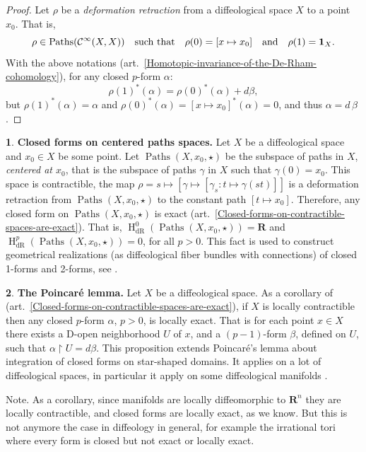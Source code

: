 \documentclass[11pt,reqno]{amsart}
\theoremstyle{definition}
\newtheorem{article}{}
\newcommand{\artlabel}[1]{{\bf #1.}}
\newcommand{\RR}{{\mathbf R}}
\def \U{{U}}
\def \X{{X}}
\newcommand{\cC}{{\mathcal C}}
\newcommand{\art}[1]{{(art.~\ref{#1})}}
\newcommand{\Paths}{\operatorname{Paths}}
\newcommand{\HDR}{{\operatorname{H}}_{\mathrm{dR}}}
\newcommand{\Cinf}{{\cC}^\infty}
\newcommand{\id}{{\bf 1}}
\begin{document}
  \begin{proof}
    Let $\rho$ be a {\em deformation retraction} from a
    diffeological space $\X$ to a point $x_0$. That is,
    $$\rho \in \Paths(\Cinf(\X,\X)) \quad \mbox{such
      that} \quad \rho(0) = [x \mapsto x_0]
      \quad\mbox{and}\quad\rho(1) = \id_\X.$$ With the
    above notations 
    \art{Homotopic-invariance-of-the-De-Rham-cohomology},
    for any closed $p$-form $\alpha$: 
    $$
      \rho(1)^*(\alpha) =
      \rho(0)^*(\alpha) + d\beta,
      $$
    but
    $\rho(1)^*(\alpha) = \alpha$ and
    $\rho(0)^*(\alpha) = [x \mapsto 
      x_0]^*(\alpha) = 0$, and thus $\alpha = d\,\beta$.
  \end{proof}
  
  \begin{article}\artlabel{Closed forms on centered paths spaces}
    \label{Closed-forms-on-centered-paths-spaces}
    Let $\X$
    be a diffeological space and $x_0 \in \X$ be some point.
    Let $\Paths(\X,x_0,\star)$ be the subspace of paths in
    $\X$, {\em centered at $x_0$\/}, that
    is the subspace of paths $\gamma$ in $\X$ such that $\gamma(0) = x_0$. 
    This space is contractible,
    the map $\rho = s \mapsto [\gamma \mapsto 
      [\gamma_{s}: t \mapsto  \gamma(st)]]$ is a deformation
    retraction from
    $\Paths(\X,x_0,\star)$ to the constant path $[t
      \mapsto x_0]$. Therefore, any closed form on
    $\Paths(\X,x_0,\star)$ is exact
    \art{Closed-forms-on-contractible-spaces-are-exact}. That
    is, $\HDR^0(\Paths(\X,x_0,\star)) = \RR$ and 
    $\HDR^p(\Paths(\X,x_0,\star)) = 0$, for all $p>0$. This
    fact is used to construct geometrical realizations (as
    diffeological fiber bundles with connections) of closed
    1-forms and 2-forms, see \cite{Piz05}.
  \end{article} %
  
  \begin{article}\artlabel{The Poincar\'e lemma} 
    \label{The-Poincare-lemma}
    Let $\X$ be a diffeological space. As a corollary of 
    \art{Closed-forms-on-contractible-spaces-are-exact}, if
    $\X$ is locally contractible \cite{Piz05}
    then any closed $p$-form $\alpha$, $p>0$, is locally exact.
    That is for each point $x \in \X$ there exists a D-open
    neighborhood $\U$ of $x$, and a
    $(p-1)$-form $\beta$, defined on $\U$, such that
    $\alpha\restriction \U = d\beta$. This proposition
    extends Poincar\'e's lemma about integration of closed
    forms on star-shaped domains. It applies on a
    lot of diffeological spaces, in particular it apply on some
    diffeological manifolds \cite{Piz06-b}.
    
    {\sc Note.} As a corollary, since manifolds are
    locally diffeomorphic to $\RR^n$ they are
    locally contractible, and closed forms are locally exact, as we know. 
    But this is not anymore the
    case in diffeology in general, for example the irrational tori
    \cite{Piz05} where every form is closed but not exact or locally exact.
  \end{article} %
	
\end{document}
